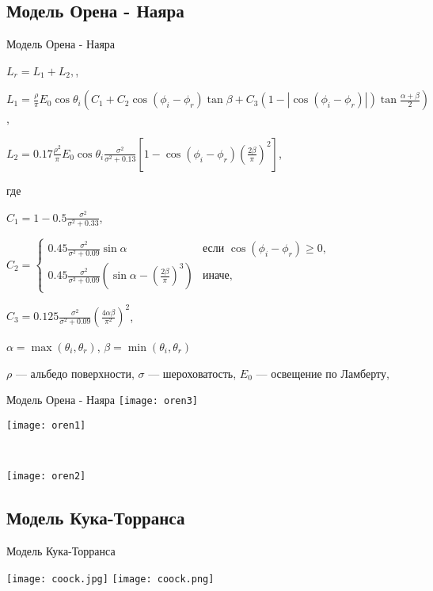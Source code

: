 \documentclass[10pt]{beamer}
\begin{document}
 \subsection{Модель Орена - Наяра}
 \begin{frame}{Модель Орена - Наяра}
 	
 	 \small
 	 $L_r = L_1+L_2,$,
 	
 	$L_1 = \frac{\rho}{\pi} E_0 \cos \theta_i \left(C_1 + C_2 \cos(\phi_i-\phi_r) \tan\beta + C_3(1-|\cos(\phi_i-\phi_r)|)\tan\frac{\alpha+\beta}2\right)$,
 	
 	$L_2 = 0.17\frac{\rho^2}\pi E_0 \cos\theta_i\frac{\sigma^2}{\sigma^2+0.13}\left[1-\cos(\phi_i-\phi_r)\left(\frac{2\beta}\pi\right)^2\right]$,
 	
 	где
 	
 	$C_1 = 1-0.5\frac{\sigma^2}{\sigma^2+0.33}$,
 	
 	$C_2 = \begin{cases}
 		0.45\frac{\sigma^2}{\sigma^2+0.09}\sin\alpha & \text{если }\cos(\phi_i-\phi_r)\ge0,\\
 		0.45\frac{\sigma^2}{\sigma^2+0.09}\left(\sin\alpha-\left(\frac{2\beta}\pi\right)^3\right) & \text{иначе,}
 	\end{cases}$
 	
 	$C_3 = 0.125\frac{\sigma^2}{\sigma^2+0.09}\left(\frac{4\alpha\beta}{\pi^2}\right)^2$,
 	
 	$\alpha = \max(\theta_i, \theta_r)$,  	$\beta = \min(\theta_i, \theta_r)$
 	
 	$\rho$ --- альбедо поверхности, $\sigma$ --- шероховатость, $E_0$ --- освещение по Ламберту, 

 	
 \end{frame}
 
 \begin{frame}{Модель Орена - Наяра}
 	{
 		\texttt{[image: oren3]}
 	}
 	{
 		\texttt{[image: oren1]}
 		
 		~
 		
 		\texttt{[image: oren2]}
 	}
 	
 \end{frame}
 
  \subsection{Модель Кука-Торранса}
 
  \begin{frame}{Модель Кука-Торранса}


		{
			\texttt{[image: coock.jpg]}	
		}
		{
			\texttt{[image: coock.png]}	
		}
 	
 	
 \end{frame}
 
\end{document}
